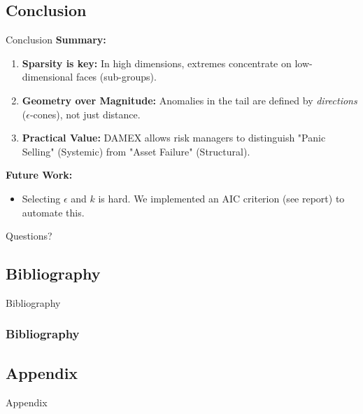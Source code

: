\documentclass{beamer}
\begin{document}
\subsection{Conclusion}
\begin{frame}{Conclusion}
    \textbf{Summary:}
    \begin{enumerate}
        \item \textbf{Sparsity is key:} In high dimensions, extremes concentrate on low-dimensional faces (sub-groups).
        \item \textbf{Geometry over Magnitude:} Anomalies in the tail are defined by \emph{directions} ($\epsilon$-cones), not just distance.
        \item \textbf{Practical Value:} DAMEX allows risk managers to distinguish "Panic Selling" (Systemic) from "Asset Failure" (Structural).
    \end{enumerate}

    \vspace{0.5cm}
    \textbf{Future Work:}
    \begin{itemize}
        \item Selecting $\epsilon$ and $k$ is hard. We implemented an AIC criterion (see report) to automate this.
    \end{itemize}

    \vspace{0.5cm}
    \centering
    \LARGE{Questions?}
\end{frame}

\subsection{Bibliography}
\begin{frame}[allowframebreaks]{Bibliography}
    \frametitle{Bibliography}
    \printbibliography[heading=none]
\end{frame}

\subsection{Appendix}
\begin{frame}{Appendix}
   
\end{frame}
\end{document}
